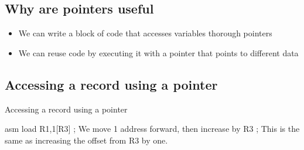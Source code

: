 \subsection{Why are pointers useful}\label{sub:why_are_pointers_useful}

\begin{itemize}
	\item We can write a block of code that accesses variables thorough pointers
	\item We can reuse code by executing it with a pointer that points to different data
\end{itemize}

\subsection{Accessing a record using a pointer}\label{sub:accessing_a_record_using_a_pointer}

\begin{highlight}{Accessing a record using a pointer}
	\begin{code}{asm}
		load R1,1[R3] ; We move 1 address forward, then increase by R3
		; This is the same as increasing the offset from R3 by one.
	\end{code}
\end{highlight}
